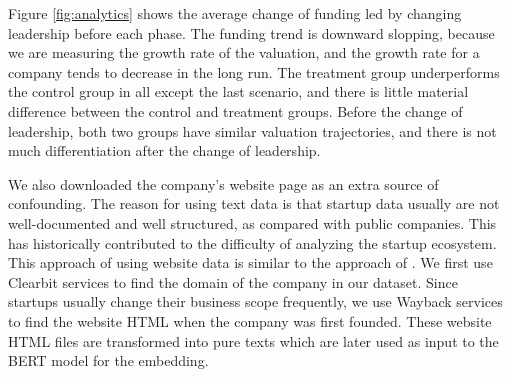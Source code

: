 \documentclass[12pt]{article}
\begin{document}
Figure \ref{fig:analytics} shows the average change of funding led by changing leadership before each phase. The funding trend is downward slopping, because we are measuring the growth rate of the valuation, and the growth rate for a company tends to decrease in the long run. The treatment group underperforms the control group in all except the last scenario, and there is little material difference between the control and treatment groups. Before the change of leadership, both two groups have similar valuation trajectories, and there is not much differentiation after the change of leadership.

We also downloaded the company's website page as an extra source of confounding. The reason for using text data is that startup data usually are not well-documented and well structured, as compared with public companies. This has historically contributed to the difficulty of analyzing the startup ecosystem. This approach of using website data is similar to the approach of \cite{guzman2021treatment}. We first use Clearbit services to find the domain of the company in our dataset. Since startups usually change their business scope frequently, we use Wayback services to find the website HTML when the company was first founded. These website HTML files are transformed into pure texts which are later used as input to the BERT model for the embedding.
\end{document}
